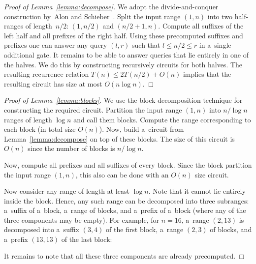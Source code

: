 \documentclass[11pt,letterpaper]{article}
\begin{document}
\begin{proof}[Proof of Lemma~\ref{lemma:decompose}]
We adopt the divide-and-conquer construction by~Alon and Schieber~\cite{Alon87optimalpreprocessing}.
Split the input range $(1,n)$ into two half-ranges of
length~$n/2$:
$(1,n/2)$ and $(n/2+1,n)$.
Compute all suffixes of the left half and all prefixes of
the right half.
Using these precomputed suffixes and
prefixes one can answer any query $(l,r)$ such that $l \le n/2
\le r$ in a~single additional gate. It remains to be able to answer
queries that lie entirely in one of the halves. We do this by
constructing recursively circuits for both halves. The resulting
recurrence relation $T(n) \le 2T(n/2)+O(n)$ implies that the
resulting circuit has size at most $O(n\log n)$.
\end{proof}

\begin{proof}[Proof of Lemma~\ref{lemma:blocks}]
We use the block decomposition technique for
constructing the required circuit.
Partition the input range $(1,n)$ into $n/\log n$ ranges
of length $\log n$ and call them blocks. Compute the range
corresponding to each block (in total size $O(n)$).
Now, build a~circuit from Lemma~\ref{lemma:decompose} on
top of these blocks. The size of this circuit is $O(n)$ since the
number of blocks is $n/\log n$.

Now, compute all prefixes and all suffixes of every block. Since
the block partition the input range $(1,n)$, this also can be done
with an $O(n)$ size circuit.

Now consider any range of length at least $\log n$. Note that it
cannot lie entirely inside the block. Hence, any such range can be
decomposed into three subranges: a~suffix of a~block, a~range
of blocks, and a~prefix of a~block
(where any of the three components may be empty). For example, for $n=16$,
a~range $(2,13)$ is decomposed into a~suffix $(3,4)$ of the
first block,
a~range $(2,3)$ of blocks, and a~prefix $(13,13)$ of
the last block:
\begin{center}
\end{center}
It remains to note that all these three components are already precomputed.
\end{proof}
\end{document}
